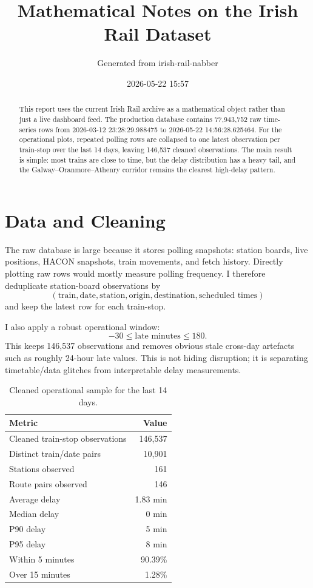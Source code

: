 \documentclass[11pt,a4paper]{article}
\title{Mathematical Notes on the Irish Rail Dataset}
\author{Generated from irish-rail-nabber}
\date{2026-05-22 15:57}
\begin{document}
\maketitle

\begin{abstract}
This report uses the current Irish Rail archive as a mathematical object rather than just a live dashboard feed. The production database contains 77,943,752 raw time-series rows from 2026-03-12 23:28:29.988475 to 2026-05-22 14:56:28.625464. For the operational plots, repeated polling rows are collapsed to one latest observation per train-stop over the last 14 days, leaving 146,537 cleaned observations. The main result is simple: most trains are close to time, but the delay distribution has a heavy tail, and the Galway--Oranmore--Athenry corridor remains the clearest high-delay pattern.
\end{abstract}

\section{Data and Cleaning}

The raw database is large because it stores polling snapshots: station boards, live positions, HACON snapshots, train movements, and fetch history. Directly plotting raw rows would mostly measure polling frequency. I therefore deduplicate station-board observations by
\[
(\text{train}, \text{date}, \text{station}, \text{origin}, \text{destination}, \text{scheduled times})
\]
and keep the latest row for each train-stop.

I also apply a robust operational window:
\[
 -30 \leq \text{late minutes} \leq 180.
\]
This keeps 146,537 observations and removes obvious stale cross-day artefacts such as roughly 24-hour late values. This is not hiding disruption; it is separating timetable/data glitches from interpretable delay measurements.

\begin{table}[H]
\centering
\begin{tabular}{lr}
\toprule
Metric & Value \\
\midrule
Cleaned train-stop observations & 146,537 \\
Distinct train/date pairs & 10,901 \\
Stations observed & 161 \\
Route pairs observed & 146 \\
Average delay & 1.83 min \\
Median delay & 0 min \\
P90 delay & 5 min \\
P95 delay & 8 min \\
Within 5 minutes & 90.39\% \\
Over 15 minutes & 1.28\% \\
\bottomrule
\end{tabular}
\caption{Cleaned operational sample for the last 14 days.}
\end{table}
\end{document}
